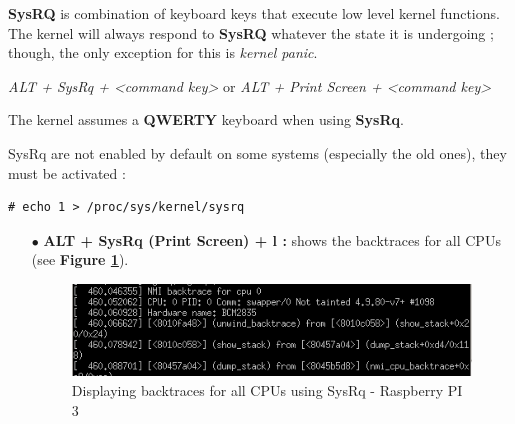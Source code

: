 \begin{itemize}
\textbf{SysRQ} is combination of keyboard keys that execute low level kernel functions. The kernel will always respond to \textbf{SysRQ}
whatever the state it is undergoing ; though, the only exception for this is \emph{kernel panic}.\\
\vspace{10px}
\begin{center}
\textit{ALT + SysRq + <command key>}
{\color{blue}or}
\textit{ALT + Print Screen + <command key>}
\end{center}

\vspace{5px}
\begin{center}
\begin{mdframed}[
        linecolor=red,linewidth=2pt,%
        frametitlerule=true,%
        apptotikzsetting={\tikzset{mdfframetitlebackground/.append style={%
            shade,left color=white, right color=blue!20}}}, 
        frametitlerulecolor=blue,
        frametitlerulewidth=1pt, innertopmargin=\topskip,
        frametitle={SysRq involves QWERTY Keyboard},
        outerlinewidth=1.25pt
    ]
		The kernel assumes a \textbf{QWERTY} keyboard when using \textbf{SysRq}.
\end{mdframed}
\end{center}


\vspace{10px}

SysRq are not enabled by default on some systems (especially the old ones), they must be activated :

	\begin{lstlisting}[style=BashInputStyle]
# echo 1 > /proc/sys/kernel/sysrq
	\end{lstlisting}
	
	\begin{itemize}
		\item[$\bullet$] \textbf{ALT + SysRq (Print Screen) + l :} shows the backtraces for all CPUs (see \textbf{Figure \ref{Displaying backtraces for all CPUs using SysRq - Raspberry PI 3}}).
		
    \begin{figure}[H]
			\centering
        	\includegraphics[scale=0.65]{img/solution/alt-sysrq-l.png}
        	\caption{Displaying backtraces for all CPUs using SysRq - Raspberry PI 3}
        	\label{Displaying backtraces for all CPUs using SysRq - Raspberry PI 3}
    \end{figure}		
		

\end{itemize}
\end{itemize}
